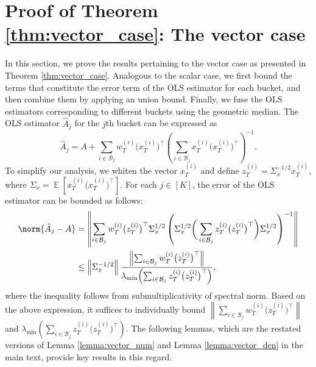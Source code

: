 \documentclass[letterpaper, 11 pt]{article}
\newcommand{\mc}{\mathcal}
\newcommand{\normlr}[1]{\left\lVert#1\right\rVert}
\DeclareMathOperator{\E}{\mathbb{E}}
\begin{document}
\newpage
\section{Proof of Theorem \ref{thm:vector_case}: The vector case}
\label{app:vector_proof}
In this section, we prove the results pertaining to the vector case as presented in Theorem \ref{thm:vector_case}. Analogous to the scalar case, we first bound the terms that constitute the error term of the OLS estimator for each bucket, and then combine them by applying an union bound. Finally, we fuse the OLS estimators corresponding to different buckets using the geometric median. The OLS estimator $\hat{A}_j$ for the $j$th bucket can be expressed as
\begin{equation*}
    \hat{A}_j = A + \sum_{i \in \mc{B}_j} w_T^{(i)}\big(x_T^{(i)}\big)^{\top}\left(\sum_{i \in \mc{B}_j} x_T^{(i)}\big(x_T^{(i)}\big)^{\top}\right)^{-1}.
    \label{eqn:ols_vector}
\end{equation*}
To simplify our analysis, we whiten the vector $x_T^{(i)}$ and define $z_T^{(i)} = \Sigma_x^{-1/2}x_T^{(i)}$, where $\Sigma_x = \E[x_T^{(i)}\big(x_T^{(i)}\big)^{\top}]$. For each $j \in [K]$, the error of the OLS estimator can be bounded as follows: 
\begin{equation*}
    \begin{aligned}
        \norm{\hat{A}_j - A} &= \normlr{\sum_{i \in \mc{B}_j} w_T^{(i)}\big(z_T^{(i)}\big)^{\top}\Sigma_x^{1/2}\left(\Sigma_x^{1/2} \bigg(\sum_{i \in \mc{B}_j} z_T^{(i)}\big(z_T^{(i)}\big)^{\top}\bigg)\Sigma_x^{1/2}\right)^{-1}} \\
        &\leq \normlr{\Sigma_x^{-1/2}} \frac{\normlr{\sum_{i \in \mc{B}_j} w_T^{(i)}\big(z_T^{(i)}\big)^{\top}}}{\lambda_{\min}{\left(\sum_{i \in \mc{B}_j} z_T^{(i)}\big(z_T^{(i)}\big)^{\top}\right)}},
    \end{aligned}
\end{equation*}
where the inequality follows from submultiplicativity of spectral norm. Based on the above expression, it suffices to individually bound $\normlr{\sum_{i \in \mc{B}_j} w_T^{(i)}\big(z_T^{(i)}\big)^{\top}}$ and $\lambda_{\min}{\left(\sum_{i \in \mc{B}_j} z_T^{(i)}\big(z_T^{(i)}\big)^{\top}\right)}$. The following lemmas, which are the restated versions of Lemma \ref{lemma:vector_num} and Lemma \ref{lemma:vector_den} in the main text, provide key results in this regard.
\end{document}
